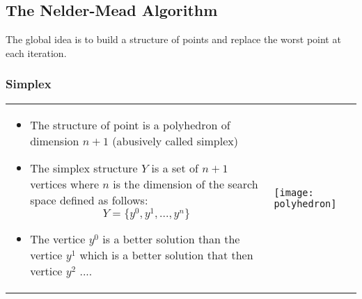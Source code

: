 \subsection{The Nelder-Mead Algorithm}

The global idea is to build a structure of points and replace the worst
point at each iteration.

\subsubsection{Simplex}
\begin{tabular}{m{12cm}m{3cm}}
    \begin{itemize}
        \item The structure of point is a polyhedron of dimension $n+1$
            (abusively called simplex)

    \item The simplex structure $Y$ is a set of $n+1$ vertices where $n$ is the
dimension of the search space defined as follows:
$$Y = \{y^0,y^1,...,y^n\}$$

\item The vertice $y^0$ is a better solution than the vertice $y^1$ which is a better solution that then vertice $y^2$ ....
        \end{itemize}
&
\texttt{[image: polyhedron]}
\end{tabular}

